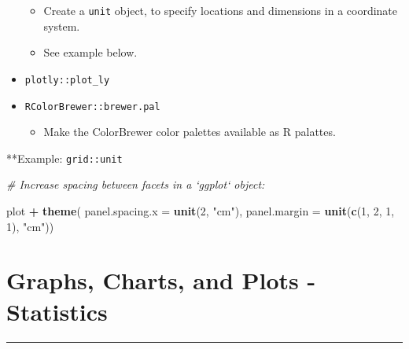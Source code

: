 \documentclass[
]{book}
\newenvironment{Shaded}{\begin{snugshade}}{\end{snugshade}}
\newcommand{\CommentTok}[1]{\textcolor[rgb]{0.56,0.35,0.01}{\textit{#1}}}
\newcommand{\DataTypeTok}[1]{\textcolor[rgb]{0.13,0.29,0.53}{#1}}
\newcommand{\DecValTok}[1]{\textcolor[rgb]{0.00,0.00,0.81}{#1}}
\newcommand{\KeywordTok}[1]{\textcolor[rgb]{0.13,0.29,0.53}{\textbf{#1}}}
\newcommand{\NormalTok}[1]{#1}
\newcommand{\OperatorTok}[1]{\textcolor[rgb]{0.81,0.36,0.00}{\textbf{#1}}}
\newcommand{\StringTok}[1]{\textcolor[rgb]{0.31,0.60,0.02}{#1}}
\providecommand{\tightlist}{%
  \setlength{\itemsep}{0pt}\setlength{\parskip}{0pt}}
\begin{document}
\begin{itemize}
  \begin{itemize}
  \tightlist
  \item
    Create a \texttt{unit} object, to specify locations and dimensions in a coordinate system.
  \item
    See example below.
  \end{itemize}
\item
  \texttt{plotly::plot\_ly}
\item
  \texttt{RColorBrewer::brewer.pal}

  \begin{itemize}
  \tightlist
  \item
    Make the ColorBrewer color palettes available as R palattes.
  \end{itemize}
\end{itemize}

**Example: \texttt{grid::unit}

\begin{Shaded}
\begin{Highlighting}[]
\CommentTok{# Increase spacing between facets in a `ggplot` object:}

\NormalTok{plot }\OperatorTok{+}\StringTok{ }
\StringTok{  }\KeywordTok{theme}\NormalTok{(}
    \DataTypeTok{panel.spacing.x =} \KeywordTok{unit}\NormalTok{(}\DecValTok{2}\NormalTok{, }\StringTok{"cm"}\NormalTok{),}
    \DataTypeTok{panel.margin =} \KeywordTok{unit}\NormalTok{(}\KeywordTok{c}\NormalTok{(}\DecValTok{1}\NormalTok{, }\DecValTok{2}\NormalTok{, }\DecValTok{1}\NormalTok{, }\DecValTok{1}\NormalTok{), }\StringTok{"cm"}\NormalTok{))}
\end{Highlighting}
\end{Shaded}

\hypertarget{graphs-charts-and-plots---statistics}{%
\section{Graphs, Charts, and Plots - Statistics}\label{graphs-charts-and-plots---statistics}}

\begin{center}\rule{0.5\linewidth}{0.5pt}\end{center}
\end{document}
